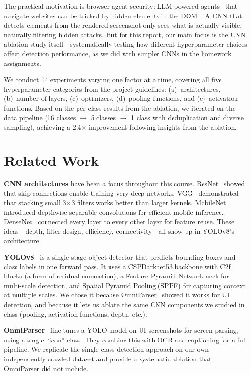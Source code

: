 \documentclass{article}
\begin{document}
The practical motivation is browser agent security: LLM-powered agents~\cite{browseruse} that navigate websites can be tricked by hidden elements in the DOM~\cite{greshake2023}. A CNN that detects elements from the rendered screenshot only sees what is actually visible, naturally filtering hidden attacks. But for this report, our main focus is the CNN ablation study itself---systematically testing how different hyperparameter choices affect detection performance, as we did with simpler CNNs in the homework assignments.

We conduct 14 experiments varying one factor at a time, covering all five hyperparameter categories from the project guidelines: (a)~architectures, (b)~number of layers, (c)~optimizers, (d)~pooling functions, and (e)~activation functions. Based on the per-class results from the ablation, we iterated on the data pipeline (16 classes $\to$ 5 classes $\to$ 1 class with deduplication and diverse sampling), achieving a 2.4$\times$ improvement following insights from the ablation.

\section{Related Work}

\textbf{CNN architectures} have been a focus throughout this course. ResNet~\cite{resnet} showed that skip connections enable training very deep networks. VGG~\cite{vgg} demonstrated that stacking small 3$\times$3 filters works better than larger kernels. MobileNet~\cite{mobilenet} introduced depthwise separable convolutions for efficient mobile inference. DenseNet~\cite{densenet} connected every layer to every other layer for feature reuse. These ideas---depth, filter design, efficiency, connectivity---all show up in YOLOv8's architecture.

\textbf{YOLOv8}~\cite{yolov8} is a single-stage object detector that predicts bounding boxes and class labels in one forward pass. It uses a CSPDarknet53 backbone with C2f blocks (a form of residual connection), a Feature Pyramid Network neck for multi-scale detection, and Spatial Pyramid Pooling (SPPF) for capturing context at multiple scales. We chose it because OmniParser~\cite{omniparser} showed it works for UI detection, and because it lets us ablate the same CNN components we studied in class (pooling, activation functions, depth, etc.).

\textbf{OmniParser}~\cite{omniparser, omniparserv2} fine-tunes a YOLO model on UI screenshots for screen parsing, using a single ``icon'' class. They combine this with OCR and captioning for a full pipeline. We replicate the single-class detection approach on our own independently crawled dataset and provide a systematic ablation that OmniParser did not include.
\end{document}
